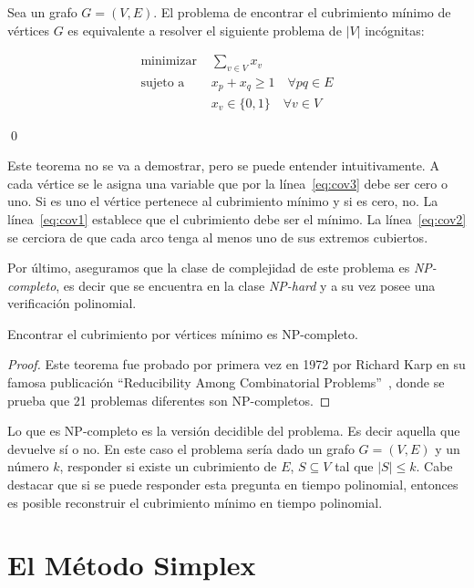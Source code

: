 \begin{teorema}\label{teo:cover_lin}
    Sea un grafo $G=(V,E)$. El problema de encontrar el cubrimiento mínimo de vértices $G$ es equivalente a resolver el siguiente problema de $|V|$ incógnitas:
    \begin{mdframed}\begin{align}
        \text{minimizar }&\sum_{v\in V} x_v\label{eq:cov1}\\
        \text{sujeto a }&x_p + x_q \geq 1 \quad \forall pq \in E\label{eq:cov2}\\
        &x_v \in \{0, 1\} \quad \forall v\in V\label{eq:cov3}
    \end{align}\end{mdframed}\qed
\end{teorema}
Este teorema no se va a demostrar, pero se puede entender intuitivamente. A cada vértice se le asigna una variable que por la línea~\ref{eq:cov3} debe ser cero o uno. Si es uno el vértice pertenece al cubrimiento mínimo y si es cero, no. La línea~\ref{eq:cov1} establece que el cubrimiento debe ser el mínimo. La línea~\ref{eq:cov2} se cerciora de que cada arco tenga al menos uno de sus extremos cubiertos.

Por último, aseguramos que la clase de complejidad de este problema es \emph{NP-completo}, es decir que se encuentra en la clase \emph{NP-hard} y a su vez posee una verificación polinomial.

\begin{teorema}
    Encontrar el cubrimiento por vértices mínimo es NP-completo.
\end{teorema}
\begin{proof}
    Este teorema fue probado por primera vez en 1972 por Richard Karp en su famosa publicación ``Reducibility Among Combinatorial Problems''~\cite{cover_np}, donde se prueba que 21 problemas diferentes son NP-completos.
\end{proof}
\begin{observacion}
    Lo que es NP-completo es la versión decidible del problema. Es decir aquella que devuelve sí o no. En este caso el problema sería dado un grafo $G=(V,E)$ y un número $k$, responder si existe un cubrimiento de $E$, $S \subseteq V$ tal que $|S|\leq k$. Cabe destacar que si se puede responder esta pregunta en tiempo polinomial, entonces es posible reconstruir el cubrimiento mínimo en tiempo polinomial.
\end{observacion}

\section{El Método Simplex}\label{sec:simplex}

